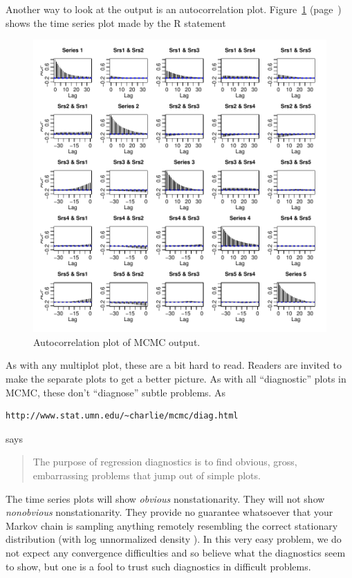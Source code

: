 \documentclass{article}
\begin{document}
Another way to look at the output is an autocorrelation plot.
Figure~\ref{fig:fig2} (page~\pageref{fig:fig2})
shows the time series plot made by the R statement
\begin{Schunk}
\end{Schunk}
\begin{figure}
\begin{center}
\includegraphics{comments_lme-fig2}
\end{center}
\caption{Autocorrelation plot of MCMC output.}
\label{fig:fig2}
\end{figure}

As with any multiplot plot, these are a bit hard to read.  Readers are
invited to make the separate plots to get a better picture.
As with all ``diagnostic'' plots in MCMC, these don't ``diagnose''
subtle problems.  As
\begin{verbatim}
http://www.stat.umn.edu/~charlie/mcmc/diag.html
\end{verbatim}
says
\begin{quotation}
The purpose of regression diagnostics is to find obvious, gross,
embarrassing problems that jump out of simple plots.
\end{quotation}
The time series plots will show \emph{obvious} nonstationarity.
They will not show \emph{nonobvious} nonstationarity.  They
provide no guarantee whatsoever that your Markov chain is sampling
anything remotely resembling the correct stationary distribution
(with log unnormalized density \verb@lupost@).  In this very easy
problem, we do not expect any convergence difficulties and so believe
what the diagnostics seem to show, but one is a fool to trust such
diagnostics in difficult problems.
\end{document}
